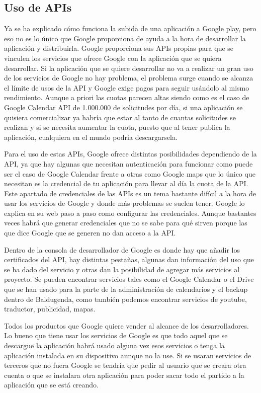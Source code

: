 \subsection{Uso de APIs}
\label{subsecc:Uso de APIs}

Ya se ha explicado cómo funciona la subida de una aplicación a Google play, pero eso no es lo único que Google proporciona de ayuda a la hora de desarrollar la aplicación y distribuirla.
Google proporciona sus APIs propias para que se vinculen los servicios que ofrece Google con la aplicación que se quiera desarrollar. Si la aplicación que se quiere desarrollar no va a realizar un gran uso de los servicios de Google no hay problema, el problema surge cuando se alcanza el límite de usos de la API y Google exige pagos para seguir usándolo al mismo rendimiento.
Aunque a priori las cuotas parecen altas siendo como es el caso de Google Calendar API \cite{GCalendar} de 1.000.000 de solicitudes por día, si una aplicación se quisiera comercializar ya habría que estar al tanto de cuantas solicitudes se realizan y si se necesita aumentar la cuota, puesto que al tener publica la aplicación, cualquiera en el mundo podria descargarsela.

Para el uso de estas APIs, Google ofrece distintas posibilidades dependiendo de la API, ya que hay algunas que necesitan autenticación para funcionar como puede ser el caso de Google Calendar frente a otras como Google maps que lo único que necesitan es la credencial de tu aplicación para llevar al día la cuota de la API.
Este apartado de credenciales de las APIs es un tema bastante difícil a la hora de usar los servicios de Google y donde más problemas se suelen tener. Google lo explica en su web paso a paso como configurar las credenciales. Aunque bastantes veces habrá que generar credenciales que no se sabe para qué sirven porque las que dice Google que se generen no dan acceso a la API.

Dentro de la consola de desarrollador de Google es donde hay que añadir los certificados del API, hay distintas pestañas, algunas dan información del uso que se ha dado del servicio y otras dan la posibilidad de agregar más servicios al proyecto.
Se pueden encontrar servicios tales como el Google Calendar o el Drive que se han usado para la parte de la administración de calendarios y el backup dentro de Baldugenda, como también podemos encontrar servicios de youtube, traductor, publicidad, mapas. 

Todos los productos que Google quiere vender al alcance de los desarrolladores.
Lo bueno que tiene usar los servicios de Google es que todo aquel que se descargue la aplicación habrá usado alguna vez esos servicios o tenga la aplicación instalada en su dispositivo aunque no la use. Si se usaran servicios de terceros que no fuera Google se tendría que pedir al usuario que se creara otra cuenta o que se instalara otra aplicación para poder sacar todo el partido a la aplicación que se está creando.

